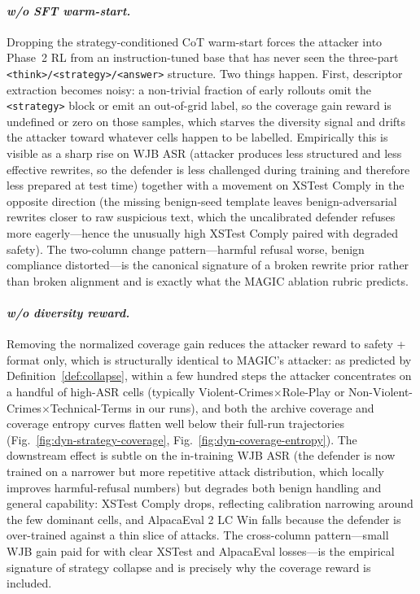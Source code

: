 \documentclass{article}
\begin{document}
\paragraph{\textit{w/o SFT warm-start.}}
Dropping the strategy-conditioned CoT warm-start forces the attacker into Phase~2 RL from an instruction-tuned base that has never seen the three-part \texttt{<think>/<strategy>/<answer>} structure. Two things happen. First, descriptor extraction becomes noisy: a non-trivial fraction of early rollouts omit the \texttt{<strategy>} block or emit an out-of-grid label, so the coverage gain reward is undefined or zero on those samples, which starves the diversity signal and drifts the attacker toward whatever cells happen to be labelled. Empirically this is visible as a sharp rise on WJB ASR (attacker produces less structured and less effective rewrites, so the defender is less challenged during training and therefore less prepared at test time) together with a movement on XSTest Comply in the opposite direction (the missing benign-seed template leaves benign-adversarial rewrites closer to raw suspicious text, which the uncalibrated defender refuses more eagerly---hence the unusually high XSTest Comply paired with degraded safety). The two-column change pattern---harmful refusal worse, benign compliance distorted---is the canonical signature of a broken rewrite prior rather than broken alignment and is exactly what the MAGIC ablation rubric predicts.

\paragraph{\textit{w/o diversity reward.}}
Removing the normalized coverage gain reduces the attacker reward to safety + format only, which is structurally identical to MAGIC's attacker: as predicted by Definition~\ref{def:collapse}, within a few hundred steps the attacker concentrates on a handful of high-ASR cells (typically Violent-Crimes$\times$Role-Play or Non-Violent-Crimes$\times$Technical-Terms in our runs), and both the archive coverage and coverage entropy curves flatten well below their full-run trajectories (Fig.~\ref{fig:dyn-strategy-coverage}, Fig.~\ref{fig:dyn-coverage-entropy}). The downstream effect is subtle on the in-training WJB ASR (the defender is now trained on a narrower but more repetitive attack distribution, which locally improves harmful-refusal numbers) but degrades both benign handling and general capability: XSTest Comply drops, reflecting calibration narrowing around the few dominant cells, and AlpacaEval 2 LC Win falls because the defender is over-trained against a thin slice of attacks. The cross-column pattern---small WJB gain paid for with clear XSTest and AlpacaEval losses---is the empirical signature of strategy collapse and is precisely why the coverage reward is included.
\end{document}

